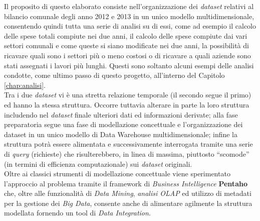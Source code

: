 	Il proposito di questo elaborato consiste nell'organizzazione dei \textit{dataset} relativi al bilancio comunale degli anno 2012 e 2013 in un unico modello multidimensionale, consentendo quindi tutta una serie di analisi su di essi, come ad esempio il calcolo delle spese totali compiute nei due anni, il calcolo delle spese compiute dai vari settori comunali e come queste si siano modificate nei due anni, la possibilità di ricavare quali sono i settori più o meno costosi o di ricavare a quali aziende sono stati assegnati i lavori più lunghi. Questi sono soltanto alcuni esempi delle analisi condotte, come ultimo passo di questo progetto, all'interno del Capitolo \ref{chap:analisi}.\\
	Tra i due \textit{dataset} vi è una stretta relazione temporale (il secondo segue il primo) ed hanno la stessa struttura. Occorre tuttavia alterare in parte la loro struttura includendo nel \textit{dataset} finale ulteriori dati ed informazioni derivate; alla fase preparatoria segue una fase di modellazione concettuale e l'organizzazione dei dataset in un unico modello di Data Warehouse multidimensionale; infine la struttura potrà essere alimentata e successivamente interrogata tramite una serie di \textit{query} (richieste) che risulterebbero, in linea di massima, piuttosto ``scomode'' (in termini di efficienza computazionale) sui \textit{dataset} originali.\\
	Oltre ai classici strumenti di modellazione concettuale viene sperimentato l'approccio al problema tramite il framework di \textit{Business Intelligence} \textbf{Pentaho} che, oltre alle funzionalità di \textit{Data Mining}, \textit{analisi OLAP} ed utilizzo di metadati per la gestione dei \textit{Big Data}, consente anche di alimentare agilmente la struttura modellata fornendo un tool di \textit{Data Integration}.
